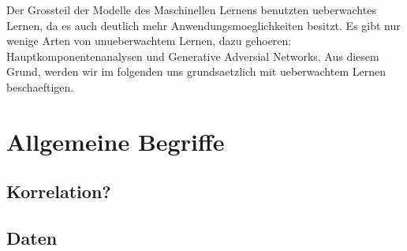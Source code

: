 Der Grossteil der Modelle des Maschinellen Lernens benutzten ueberwachtes
Lernen, da es auch deutlich mehr Anwendungsmoeglichkeiten besitzt. Es gibt nur wenige Arten von
unueberwachtem Lernen, dazu gehoeren: Hauptkomponentenanalysen und Generative
Adversial Networks. Aus diesem Grund, werden wir im folgenden uns grundsaetzlich
mit ueberwachtem Lernen beschaeftigen.
\para{}
\cite{wiki:supervised_learning}
\cite{wiki:unsupervised_learning}

\section{Allgemeine Begriffe}

\subsection{Korrelation?}

\subsection{Daten}

